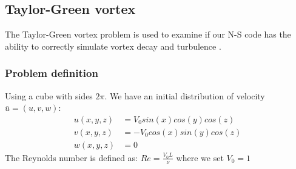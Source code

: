\subsection{Taylor-Green vortex}
The Taylor-Green vortex problem is used to examine if our N-S code has the ability to correctly simulate vortex decay and turbulence \cite{DeBonis2013}.
\subsubsection{Problem definition}
Using a cube with sides $2\pi$. \newline
We have an initial distribution of velocity $\bar{u} = (u,v,w)$:
\begin{align}
u(x,y,z) &= V_0sin(x)cos(y)cos(z) \\
v(x,y,z) &= - V_0cos(x)sin(y)cos(z)  \\
w(x,y,z) &= 0  
\end{align}
The Reynolds number is defined as: $Re = \frac{V_0 L}{\nu}$ where we set $V_0 = 1$












